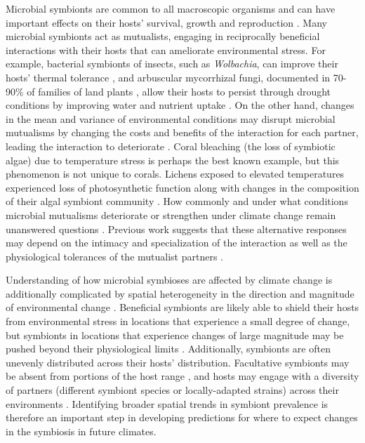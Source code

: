 \documentclass[11pt]{article}
\let\cite\citep
\begin{document}
Microbial symbionts are common to all macroscopic organisms and can have important effects on their hosts' survival, growth and reproduction \cite{rodriguez2009fungal,mcfall2013animals}.
Many microbial symbionts act as mutualists, engaging in reciprocally beneficial interactions with their hosts that can ameliorate environmental stress. 
For example, bacterial symbionts of insects, such as \emph{Wolbachia}, can improve their hosts' thermal tolerance \citep{truitt2019wolbachia, renoz2019evolutionary}, and arbuscular mycorrhizal fungi, documented in 70-90\% of families of land plants \citep{parniske2008arbuscular}, allow their hosts to persist through drought conditions by improving water and nutrient uptake \citep{cheng2021elucidating}.
On the other hand, changes in the mean and variance of environmental conditions may disrupt microbial  mutualisms by changing the costs and benefits of the interaction for each partner, leading the interaction to deteriorate \citep{aslan2013mutualism, fowler2024microbial}. 
Coral bleaching (the loss of symbiotic algae) due to temperature stress \citep{sully2019global} is perhaps the best known example, but this phenomenon is not unique to corals.
Lichens exposed to elevated temperatures experienced loss of photosynthetic function along with changes in the composition of their algal symbiont community \citep{meyer2022climate}.
How commonly and under what conditions microbial mutualisms deteriorate or strengthen under climate change remain unanswered questions \citep{frederickson2017mutualisms}.
Previous work suggests that these alternative responses may depend on the intimacy and specialization of the interaction as well as the physiological tolerances of the mutualist partners \citep{toby2010mutualisms, warren2014mutualism, rafferty2015phenological}. 

Understanding of how microbial symbioses are affected by climate change is additionally complicated by spatial heterogeneity in the direction and magnitude of environmental change \cite{ipcc_2021}. 
Beneficial symbionts are likely able to shield their hosts from environmental stress in locations that experience a small degree of change, but symbionts in locations that experience changes of large magnitude may be pushed beyond their physiological limits \cite{webster2008temperature}.
Additionally, symbionts are often unevenly distributed across their hosts' distribution.
Facultative symbionts may be absent from portions of the host range \cite{afkhami2014mutualist}, and hosts may engage with a diversity of partners (different symbiont species or locally-adapted strains) across their environments \cite{frade2008variation, rolshausen2018quantifying, fowler2023geographic}.
Identifying broader spatial trends in symbiont prevalence is therefore an important step in developing predictions for where to expect changes in the symbiosis in future climates.
\end{document}

